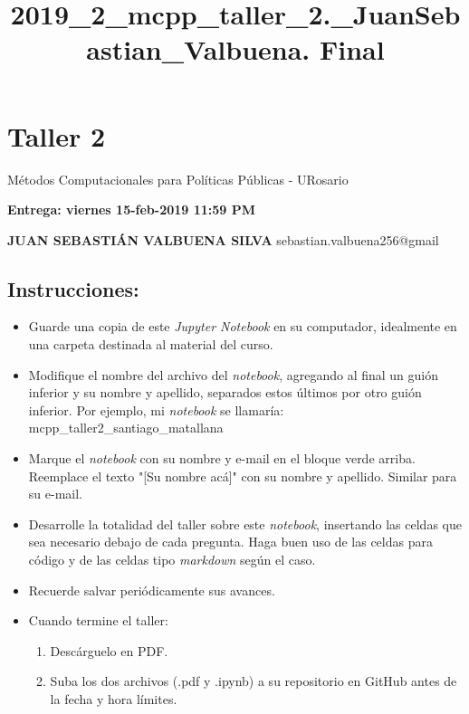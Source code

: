 \documentclass[11pt]{article}
\title{2019\_2\_mcpp\_taller\_2.\_JuanSebastian\_Valbuena. Final}
\providecommand{\tightlist}{%
      \setlength{\itemsep}{0pt}\setlength{\parskip}{0pt}}
\begin{document}
    
    
    \maketitle
    
    

    
    \section{Taller 2}\label{taller-2}

Métodos Computacionales para Políticas Públicas - URosario

\textbf{Entrega: viernes 15-feb-2019 11:59 PM}

    \textbf{JUAN SEBASTIÁN VALBUENA SILVA} sebastian.valbuena256@gmail

    \subsection{Instrucciones:}\label{instrucciones}

\begin{itemize}
\tightlist
\item
  Guarde una copia de este \emph{Jupyter Notebook} en su computador,
  idealmente en una carpeta destinada al material del curso.
\item
  Modifique el nombre del archivo del \emph{notebook}, agregando al
  final un guión inferior y su nombre y apellido, separados estos
  últimos por otro guión inferior. Por ejemplo, mi \emph{notebook} se
  llamaría: mcpp\_taller2\_santiago\_matallana
\item
  Marque el \emph{notebook} con su nombre y e-mail en el bloque verde
  arriba. Reemplace el texto "{[}Su nombre acá{]}" con su nombre y
  apellido. Similar para su e-mail.
\item
  Desarrolle la totalidad del taller sobre este \emph{notebook},
  insertando las celdas que sea necesario debajo de cada pregunta. Haga
  buen uso de las celdas para código y de las celdas tipo
  \emph{markdown} según el caso.
\item
  Recuerde salvar periódicamente sus avances.
\item
  Cuando termine el taller:

  \begin{enumerate}
  \def\labelenumi{\arabic{enumi}.}
  \tightlist
  \item
    Descárguelo en PDF.
  \item
    Suba los dos archivos (.pdf y .ipynb) a su repositorio en GitHub
    antes de la fecha y hora límites.
  \end{enumerate}
\end{itemize}
\end{document}

